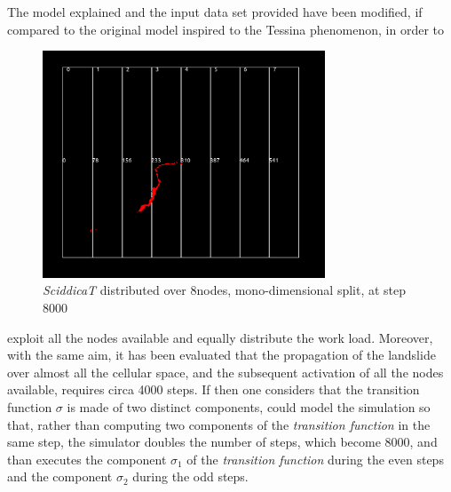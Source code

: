 \documentclass[12pt,a4paper,fleqn]{report}
\begin{document}
The model explained and the input data set provided have been modified, if 
compared to the original model inspired to the Tessina phenomenon, in order to 

 \begin{figure}[ht!]
\centering
	\vspace{13pt}
    \includegraphics[trim=0mm 10mm 0mm 10mm,width=0.75\textwidth]{late_state}
    \caption{\textit{SciddicaT} distributed over 8nodes, mono-dimensional split, at step 8000}
\end{figure}

\newpage
exploit all the nodes available and equally distribute the work load. Moreover, with the same aim, it has been evaluated that the propagation of the landslide over almost all the cellular space, and the subsequent activation of all the nodes available, requires circa 4000 steps. If then one considers that the transition function $\sigma$ is made of two distinct components, could model the simulation so that, rather than computing two components of the \textit{transition function} in the same step, the simulator doubles the number of steps, which become 8000, and than executes the component $\sigma_1$ of the \textit{transition function} during the even steps and the component $\sigma_2$ during the odd steps.
\end{document}
